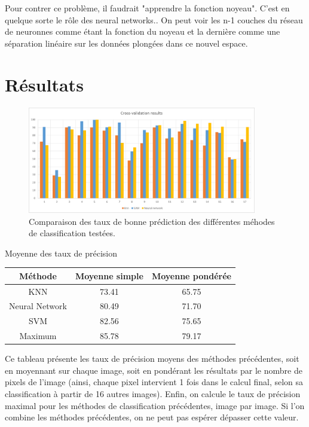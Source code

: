 \documentclass[a4paper,10pt]{report}
\begin{document}
Pour contrer ce problème, il faudrait "apprendre la fonction noyeau". C'est en quelque sorte le rôle des neural networks.. On peut voir les n-1 couches du réseau de neuronnes comme étant la fonction du noyeau et la dernière comme une séparation linéaire sur les données plongées dans ce nouvel espace.

\section*{Résultats}

\begin{figure}[htbp]
  \caption{Comparaison des taux de bonne prédiction des différentes méhodes de classification testées.}
  \centering
  \includegraphics[width=10cm]{Compared_CV.png}
\end{figure}

\begin{center}
Moyenne des taux de précision\\

\begin{tabular}{|c|c|c|}  
  \hline
  Méthode & Moyenne simple & Moyenne pondérée\\
  \hline
  KNN & 73.41 & 65.75\\
  Neural Network & 80.49 & 71.70\\  
  SVM & 82.56 & 75.65\\
  \hline
  Maximum & 85.78 & 79.17\\
  \hline
\end{tabular}
\end{center}

Ce tableau présente les taux de précision moyens des méthodes précédentes, soit en moyennant sur chaque image, soit en pondérant les résultats par le nombre de pixels de l'image (ainsi, chaque pixel intervient 1 fois dans le calcul final, selon sa classification à partir de 16 autres images).
Enfin, on calcule le taux de précision maximal pour les méthodes de classification précédentes, image par image. Si l'on combine les méthodes précédentes, on ne peut pas espérer dépasser cette valeur.
\end{document}
